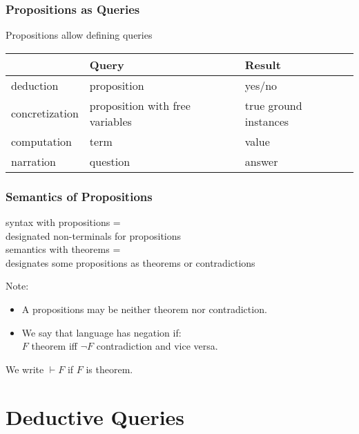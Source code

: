 \begin{frame}\frametitle{Propositions as Queries}
Propositions allow defining queries

\begin{center}
\footnotesize
\begin{tabular}{l|ll}
& Query & Result\\
\hline
deduction & proposition & yes/no \\
concretization & proposition with free variables & true ground instances \\
computation & term & value \\
narration & question & answer \\
\end{tabular}
\end{center}
\end{frame}

\begin{frame}\frametitle{Semantics of Propositions}
syntax with propositions = \\
designated non-terminals for propositions \\
semantics with theorems = \\
designates some propositions as theorems or contradictions

Note:
\begin{itemize}
\item A propositions may be neither theorem nor contradiction.
\item We say that language has negation if:\\ $F$ theorem iff $\neg F$ contradiction and vice versa.
\end{itemize}

We write $\vdash F$ if $F$ is theorem.
\end{frame}

\section{Deductive Queries}

